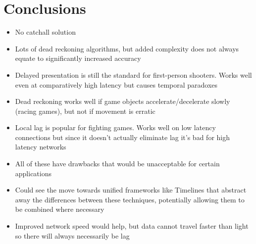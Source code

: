 \documentclass[conference]{IEEEtran}
\begin{document}
	\section{Conclusions}

	\begin{itemize}
		\item No catchall solution
		\item Lots of dead reckoning algorithms, but added complexity does not always equate to significantly increased accuracy
		\item Delayed presentation is still the standard for first-person shooters. Works well even at comparatively high latency but causes temporal paradoxes
		\item Dead reckoning works well if game objects accelerate/decelerate slowly (racing games), but not if movement is erratic
		\item Local lag is popular for fighting games. Works well on low latency connections but since it doesn't actually eliminate lag it's bad for high latency networks
		\item All of these have drawbacks that would be unacceptable for certain applications
		\item Could see the move towards unified frameworks like Timelines that abstract away the differences between these techniques, potentially allowing them to be combined where necessary
		\item Improved network speed would help, but data cannot travel faster than light so there will always necessarily be lag
	\end{itemize}

	\printbibliography
\end{document}
